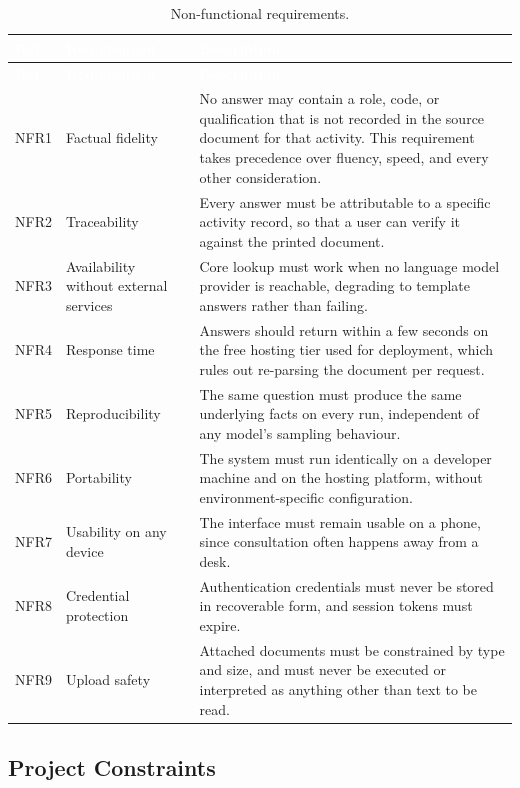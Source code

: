\begin{longtable}{|p{}|p{}|p{}|}
\caption{Non-functional requirements.}\label{tab:nfr}\\
\hline
\rowcolor{myblue}\textcolor{white}{\textbf{Ref.}} & \textcolor{white}{\textbf{Requirement}} & \textcolor{white}{\textbf{Description}} \\
\hline
\endfirsthead
\hline
\rowcolor{myblue}\textcolor{white}{\textbf{Ref.}} & \textcolor{white}{\textbf{Requirement}} & \textcolor{white}{\textbf{Description}} \\
\hline
\endhead
NFR1 & Factual fidelity & No answer may contain a role, code, or qualification that is not recorded in the source document for that activity. This requirement takes precedence over fluency, speed, and every other consideration. \\ \hline
NFR2 & Traceability & Every answer must be attributable to a specific activity record, so that a user can verify it against the printed document. \\ \hline
NFR3 & Availability without external services & Core lookup must work when no language model provider is reachable, degrading to template answers rather than failing. \\ \hline
NFR4 & Response time & Answers should return within a few seconds on the free hosting tier used for deployment, which rules out re-parsing the document per request. \\ \hline
NFR5 & Reproducibility & The same question must produce the same underlying facts on every run, independent of any model's sampling behaviour. \\ \hline
NFR6 & Portability & The system must run identically on a developer machine and on the hosting platform, without environment-specific configuration. \\ \hline
NFR7 & Usability on any device & The interface must remain usable on a phone, since consultation often happens away from a desk. \\ \hline
NFR8 & Credential protection & Authentication credentials must never be stored in recoverable form, and session tokens must expire. \\ \hline
NFR9 & Upload safety & Attached documents must be constrained by type and size, and must never be executed or interpreted as anything other than text to be read. \\ \hline
\end{longtable}

\subsection{Project Constraints}

